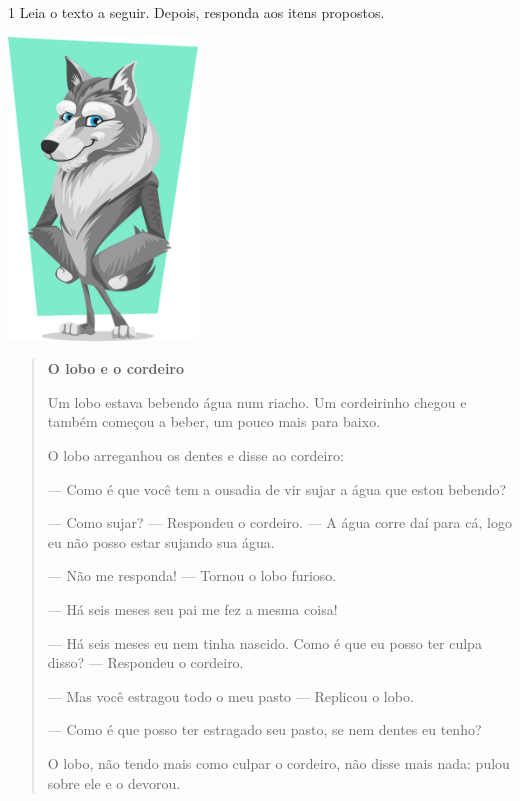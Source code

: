 
\num{1} Leia o texto a seguir. Depois, responda aos itens propostos.


\includegraphics[width=1.97917in,height=3.16667in]{./media/image5.png}

\begin{quote}
\textbf{O lobo e o cordeiro}

Um lobo estava bebendo água num riacho. Um cordeirinho chegou e também
começou a beber, um pouco mais para baixo.

O lobo arreganhou os dentes e disse ao cordeiro:

--- Como é que você tem a ousadia de vir sujar a água que estou bebendo?

--- Como sujar? --- Respondeu o cordeiro. --- A água corre daí para cá,
logo eu não posso estar sujando sua água.

--- Não me responda! --- Tornou o lobo furioso.

--- Há seis meses seu pai me fez a mesma coisa!

--- Há seis meses eu nem tinha nascido. Como é que eu posso ter culpa
disso? --- Respondeu o cordeiro.

--- Mas você estragou todo o meu pasto --- Replicou o lobo.

--- Como é que posso ter estragado seu pasto, se nem dentes eu tenho?

O lobo, não tendo mais como culpar o cordeiro, não disse mais nada:
pulou sobre ele e o devorou.

\end{quote}

